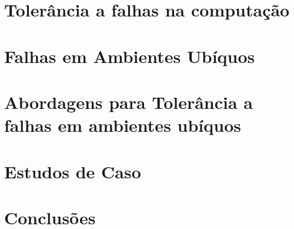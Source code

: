 \documentclass{SBCbookchapter}
\begin{document}

\section{Tolerância a falhas na computação}
\label{sec:falhas_comp}


\section{Falhas em Ambientes Ubíquos}
\label{sec:falhas_ubicomp}


\section{Abordagens para Tolerância a falhas em ambientes ubíquos}
\label{sec:tolerancia}


\section{Estudos de Caso}
\label{sec:estudos}


\section{Conclusões}
\label{sec:conclusoes}


	



\end{document}
